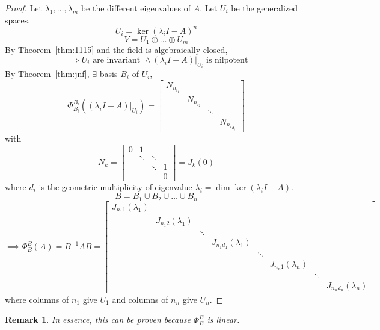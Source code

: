 \documentclass[a4paper]{article}
\numberwithin{lecref}{section}
\newtheorem*{Remark}{Remark}
\begin{document}
\begin{proof}
  Let $\lambda_1, \dots, \lambda_m$ be the different eigenvalues of $A$. Let $U_i$ be the generalized spaces.
  \[ U_i = \ker(\lambda_i I - A)^n \]
  \[ V = U_1 \oplus \dots \oplus U_m \]
  By Theorem~\ref{thm:1115} and the field is algebraically closed,
  \[ \implies U_i \text{ are invariant } \land (\lambda_i I - A)|_{U_i} \text{ is nilpotent} \]
  By Theorem~\ref{thm:jnf}, $\exists$ basis $B_i$ of $U_i$,
  \[
    \Phi_{B_i}^{B_i}\left((\lambda_i I - A)|_{U_i}\right) = \begin{bmatrix}
      N_{n_{i_1}} & & & \\
      & N_{n_{i_2}} & & \\
      & & \ddots & \\
      & & & N_{{n_i}_{d_i}}
    \end{bmatrix}
  \]
  with
  \[ N_k = \begin{bmatrix} 0 & 1 & & \\ & \ddots & \ddots & \\ & & \ddots & 1 \\ & & & 0 \end{bmatrix} = J_k(0) \]
  where $d_i$ is the geometric multiplicity of eigenvalue $\lambda_i = \dim{\ker(\lambda_i I - A)}$.
  \[ B = B_1 \cup B_2 \cup \dots \cup B_n \]
  \[
    \implies \Phi_B^B(A) = B^{-1} AB = \begin{bmatrix}
      J_{n_{1} 1}(\lambda_1) & & & & & & & \\
      & J_{n_{1} 2}(\lambda_1) & & & & & & \\
      & & \ddots & & & & & \\
      & & & J_{n_{1} d_1}(\lambda_1) & & & & \\
      & & & & \ddots & & & \\
      & & & & & J_{n_n 1}(\lambda_n) & & \\
      & & & & & & \ddots & \\
      & & & & & & & J_{n_n d_n}(\lambda_n)
    \end{bmatrix}
  \]
  where columns of $n_1$ give $U_1$ and columns of $n_n$ give $U_n$.
\end{proof}

\begin{Remark}
  In essence, this can be proven because $\Phi_B^B$ is linear.
\end{Remark}
\end{document}
